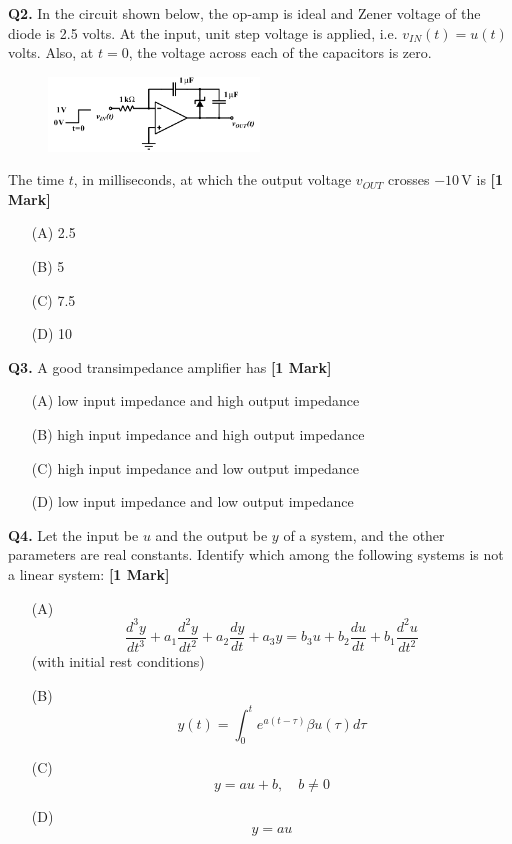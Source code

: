 \documentclass[11pt]{article}
\newcommand{\questiona}[2]{
    \noindent\textbf{Q#2.} #1 \hfill \textbf{[1 Mark]}
}
\begin{document}
\questiona{In the circuit shown below, the op-amp is ideal and Zener voltage of the diode is 2.5 volts. At the input, unit step voltage is applied, i.e. $v_{IN}(t) = u(t)$ volts. Also, at $t = 0$, the voltage across each of the capacitors is zero.

\begin{center}
\begin{figure}[h]
    \centering
	\includegraphics[width=0.5\textwidth]{figures/2.png}
\end{figure}
\end{center}

The time $t$, in milliseconds, at which the output voltage $v_{OUT}$ crosses $-10\, \text{V}$ is}{2}
\begin{enumerate}
    \item[(A)] 2.5
    \item[(B)] 5
    \item[(C)] 7.5
    \item[(D)] 10
\end{enumerate}

\vspace{0.5cm}

\questiona{A good transimpedance amplifier has}{3}
\begin{enumerate}
    \item[(A)] low input impedance and high output impedance
    \item[(B)] high input impedance and high output impedance
    \item[(C)] high input impedance and low output impedance
    \item[(D)] low input impedance and low output impedance
\end{enumerate}

\vspace{0.5cm}

\questiona{Let the input be \( u \) and the output be \( y \) of a system, and the other parameters are real constants. Identify which among the following systems is not a linear system:}{4}
\begin{enumerate}
    \item[(A)] \[ \frac{d^3y}{dt^3} + a_1 \frac{d^2y}{dt^2} + a_2 \frac{dy}{dt} + a_3y = b_3u + b_2 \frac{du}{dt} + b_1 \frac{d^2u}{dt^2} \] (with initial rest conditions)
    \item[(B)] \[ y(t) = \int_{0}^{t} e^{a(t-\tau)} \beta u(\tau) d\tau \]
    \item[(C)] \[ y = au + b, \quad b \neq 0 \]
    \item[(D)] \[ y = au \]
\end{enumerate}
\end{document}
